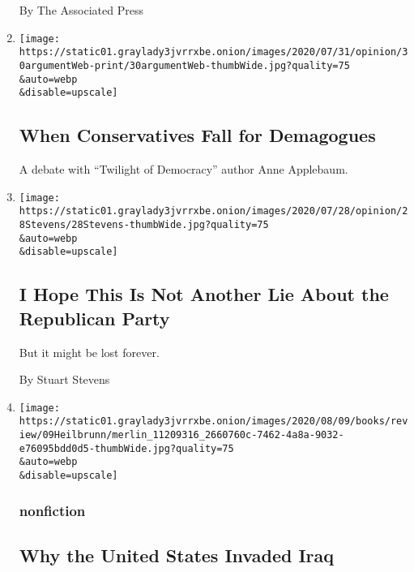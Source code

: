 \begin{enumerate}
  By The Associated Press
\item
  \href{/2020/07/30/opinion/the-argument-authoritarianism-anne-applebaum.html}{}

  \texttt{[image: https://static01.graylady3jvrrxbe.onion/images/2020/07/31/opinion/30argumentWeb-print/30argumentWeb-thumbWide.jpg?quality=75\\\&auto=webp\\\&disable=upscale]}

  \hypertarget{when-conservatives-fall-for-demagogues}{%
  \subsection{When Conservatives Fall for
  Demagogues}\label{when-conservatives-fall-for-demagogues}}

  A debate with ``Twilight of Democracy'' author Anne Applebaum.
\item
  \href{/2020/07/29/opinion/trump-republican-party-racism.html}{}

  \texttt{[image: https://static01.graylady3jvrrxbe.onion/images/2020/07/28/opinion/28Stevens/28Stevens-thumbWide.jpg?quality=75\\\&auto=webp\\\&disable=upscale]}

  \hypertarget{i-hope-this-is-not-another-lie-about-the-republican-party}{%
  \subsection{I Hope This Is Not Another Lie About the Republican
  Party}\label{i-hope-this-is-not-another-lie-about-the-republican-party}}

  But it might be lost forever.

  By Stuart Stevens
\item
  \href{/2020/07/28/books/review/to-start-a-war-robert-draper.html}{}

  \texttt{[image: https://static01.graylady3jvrrxbe.onion/images/2020/08/09/books/review/09Heilbrunn/merlin\_11209316\_2660760c-7462-4a8a-9032-e76095bdd0d5-thumbWide.jpg?quality=75\\\&auto=webp\\\&disable=upscale]}

  \hypertarget{nonfiction}{%
  \subsubsection{nonfiction}\label{nonfiction}}

  \hypertarget{why-the-united-states-invaded-iraq}{%
  \subsection{Why the United States Invaded
  Iraq}\label{why-the-united-states-invaded-iraq}}


\end{enumerate}
